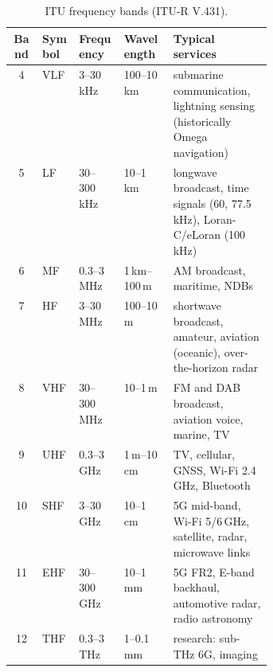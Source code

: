 \begin{table}[htbp]\centering\small
\caption{ITU frequency bands (ITU-R V.431).}\label{tab:appA:itubands}
\begin{tabular}{@{}clllp{0.38\linewidth}@{}}
\toprule
Band & Symbol & Frequency & Wavelength & Typical services\\
\midrule
4 & VLF & 3--30\,kHz & 100--10\,km & submarine communication, lightning sensing (historically Omega navigation)\\
5 & LF & 30--300\,kHz & 10--1\,km & longwave broadcast, time signals (60, 77.5\,kHz), Loran-C/eLoran (100\,kHz)\\
6 & MF & 0.3--3\,MHz & 1\,km--100\,m & AM broadcast, maritime, NDBs\\
7 & HF & 3--30\,MHz & 100--10\,m & shortwave broadcast, amateur, aviation (oceanic), over-the-horizon radar\\
8 & VHF & 30--300\,MHz & 10--1\,m & FM and DAB broadcast, aviation voice, marine, TV\\
9 & UHF & 0.3--3\,GHz & 1\,m--10\,cm & TV, cellular, GNSS, Wi-Fi 2.4\,GHz, Bluetooth\\
10 & SHF & 3--30\,GHz & 10--1\,cm & 5G mid-band, Wi-Fi 5/6\,GHz, satellite, radar, microwave links\\
11 & EHF & 30--300\,GHz & 10--1\,mm & 5G FR2, E-band backhaul, automotive radar, radio astronomy\\
12 & THF & 0.3--3\,THz & 1--0.1\,mm & research: sub-THz 6G, imaging\\
\bottomrule
\end{tabular}
\end{table}

